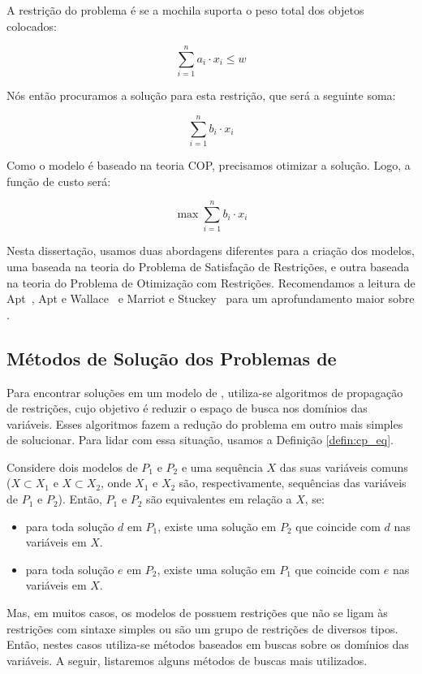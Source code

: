 A restrição do problema é se a mochila suporta o peso total dos
objetos colocados:

\[
    \sum_{i=1}^{n} a_i \cdot x_i \leq w
\]

Nós então procuramos a solução para esta restrição, que será a seguinte 
soma:

\[
    \sum_{i=1}^{n} b_i \cdot x_i
\]

Como o modelo é baseado na teoria COP, precisamos otimizar a solução.
Logo, a função de custo será:

\[
    \max \sum_{i=1}^{n} b_i \cdot x_i
\]

Nesta dissertação, usamos duas abordagens diferentes para a criação dos
modelos, uma baseada na teoria do Problema de Satisfação de Restrições,
e outra baseada na teoria do Problema de Otimização com Restrições.
Recomendamos a leitura de Apt~\cite{Apt*2003}, Apt e
Wallace~\cite{AptWallace*2007} e Marriot e Stuckey~\cite{Marriott*1998}
para um aprofundamento maior sobre \pr{}.

\subsection{Métodos de Solução dos Problemas de \PR{}}
\label{subsec:sol_cp}
Para encontrar soluções em um modelo de \pr{}, utiliza-se algoritmos
de propagação de restrições, cujo objetivo é reduzir o espaço de busca
nos domínios das variáveis. Esses algoritmos fazem a redução do
problema em outro mais simples de solucionar. Para lidar com essa
situação, usamos a Definição \ref{defin:cp_eq}.
\begin{defin}
\label{defin:cp_eq}
Considere dois modelos de \pr{} $P_{1}$ e $P_{2}$ e uma sequência $X$
das suas variáveis comuns ($X \subset X_{1}$ e $X \subset X_{2}$, onde
$X_{1}$ e $X_{2}$ são, respectivamente, sequências das variáveis de
$P_{1}$ e $P_{2}$). Então, $P_{1}$ e $P_{2}$ são equivalentes em
relação a $X$, se:
\begin{itemize}
  \item{para toda solução $d$ em $P_{1}$, existe uma solução em
  $P_{2}$ que coincide com $d$ nas variáveis em $X$.}

  \item{para toda solução $e$ em $P_{2}$, existe uma solução em
  $P_{1}$ que coincide com $e$ nas variáveis em $X$.}
\end{itemize}
\end{defin}

Mas, em muitos casos, os modelos de \pr{} possuem restrições que não
se ligam às restrições com sintaxe simples ou são um grupo de
restrições de diversos tipos. Então, nestes casos utiliza-se métodos
baseados em buscas sobre os domínios das variáveis. A seguir,
listaremos alguns métodos de buscas mais utilizados.

